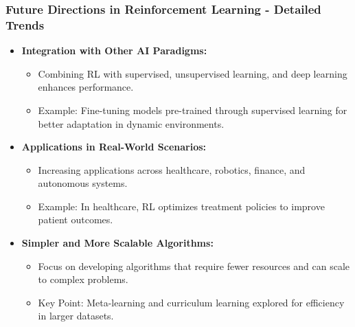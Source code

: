 \documentclass[aspectratio=169]{beamer}
\begin{document}
\begin{frame}[fragile]
    \frametitle{Future Directions in Reinforcement Learning - Detailed Trends}
    \begin{itemize}
        \item \textbf{Integration with Other AI Paradigms:}
        \begin{itemize}
            \item Combining RL with supervised, unsupervised learning, and deep learning enhances performance.
            \item Example: Fine-tuning models pre-trained through supervised learning for better adaptation in dynamic environments.
        \end{itemize}

        \item \textbf{Applications in Real-World Scenarios:}
        \begin{itemize}
            \item Increasing applications across healthcare, robotics, finance, and autonomous systems.
            \item Example: In healthcare, RL optimizes treatment policies to improve patient outcomes.
        \end{itemize}

        \item \textbf{Simpler and More Scalable Algorithms:}
        \begin{itemize}
            \item Focus on developing algorithms that require fewer resources and can scale to complex problems.
            \item Key Point: Meta-learning and curriculum learning explored for efficiency in larger datasets.
        \end{itemize}
    \end{itemize}
\end{frame}
\end{document}
